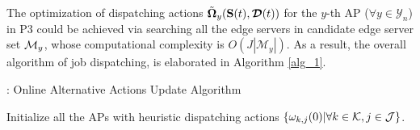 The optimization of dispatching actions $\tilde{\boldsymbol{\Omega}}_{y}(\mathbf{S}(t),\boldsymbol{\mathcal{D}}(t))$ for the $y$-th AP ($\forall y\in\mathcal{Y}_{n}$) in P3 could be achieved via searching all the edge servers in candidate edge server set $\mathcal{M}_{y}$, whose computational complexity is $O(J|\mathcal{M}_{y}|)$.
As a result, the overall algorithm of job dispatching, is elaborated in Algorithm \ref{alg_1}.
\begin{algorithm}[ht]
    \caption{{\Dalgname}: Online Alternative Actions Update Algorithm}\label{alg_1}
    \DontPrintSemicolon
    Initialize all the APs with heuristic dispatching actions $\{{\omega}_{k,j}(0)|\forall k\in\mathcal{K},j\in\mathcal{J}\}$.\;
\end{algorithm}

